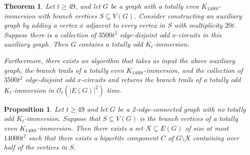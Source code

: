 \documentclass[10pt,a4paper]{amsart}
\newtheorem{theorem}{Theorem}
\newtheorem{proposition}{Proposition}
\begin{document}
\begin{theorem}\label{thm:makingImmersionOdd}
    Let $t \geq 49$, and let $G$ be a graph with a totally even $K_{1400t}$-immersion with branch vertices $S \subseteq V(G)$. Consider constructing an auxiliary graph by adding a vertex $x$ adjacent to every vertex in $S$ with multiplicity $20t$. Suppose there is a collection of $3500t^2$ edge-disjoint odd $x$-circuits in this auxiliary graph. Then $G$ contains a totally odd $K_t$-immersion.

    Furthermore, there exists an algorithm that takes as input the above auxiliary graph, the branch trails of a totally even $K_{1400t}$-immersion, and the collection of $3500t^2$ edge-disjoint odd $x$-circuits and returns the branch trails of a totally odd $K_t$-immersion in $\mathcal{O}_t(|E(G)|^2)$ time.
\end{theorem}

\begin{proposition}\label{prop:ImmersionGivesEdgeCut}
    Let $t \geq 49$ and let $G$ be a 2-edge-connected graph with no totally odd $K_t$-immersion. Suppose that $S \subseteq V(G)$ is the branch vertices of a totally even $K_{1400t}$-immersion. Then there exists a set $X \subseteq E(G)$ of size at most $14000t^2$ such that there exists a bipartite component $C$ of $G \setminus X$ containing over half of the vertices in $S$.
\end{proposition}
\end{document}
